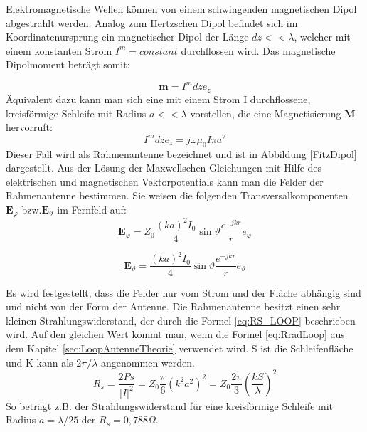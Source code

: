 Elektromagnetische Wellen können  von einem schwingenden magnetischen Dipol
abgestrahlt werden. Analog zum Hertzschen Dipol befindet sich im Koordinatenursprung
ein magnetischer Dipol der Länge $dz<<\lambda$, welcher mit einem konstanten
Strom $I^{m}=constant$ durchflossen wird. Das magnetische Dipolmoment beträgt somit:

\begin{equation}
\textbf{m}=I^{m}dze_z
\end{equation}
Äquivalent dazu kann man sich eine mit einem Strom I durchflossene, kreisförmige Schleife mit Radius $a<<\lambda$ vorstellen, die eine Magnetisierung $\textbf{M}$ hervorruft:
\begin{equation}
I^{m}dze_{z}=j\omega\mu_{0}I\pi a^{2}
\end{equation}
Dieser Fall wird als Rahmenantenne bezeichnet und ist in Abbildung \ref{FitzDipol} dargestellt. Aus der Lösung der Maxwellschen Gleichungen mit Hilfe des elektrischen und
magnetischen Vektorpotentials kann man die Felder der Rahmenantenne bestimmen.
Sie weisen die folgenden Transversalkomponenten $\textbf{E}_{\varphi}$ bzw.$\textbf{E}_{\vartheta}$ im Fernfeld auf:
\begin{equation}
\textbf{E}_{\varphi}=Z_{0}\dfrac{(ka)^2I_{0}}{4}\sin \vartheta \dfrac{e^{-jkr}}{r} e_{\varphi}
\end{equation}

\begin{equation}
\textbf{E}_{\vartheta}=\dfrac{(ka)^2I_{0}}{4}\sin \vartheta \dfrac{e^{-jkr}}{r} e_{\vartheta}
\end{equation}


Es wird festgestellt, dass die Felder nur vom Strom und der Fläche abhängig sind
und nicht von der Form der Antenne. 
Die Rahmenantenne besitzt einen sehr kleinen Strahlungswiderstand, der durch die
Formel \ref{eq:RS_LOOP} beschrieben wird. Auf den gleichen Wert kommt man, wenn die Formel \ref{eq:RradLoop} aus dem Kapitel \ref{sec:LoopAntenneTheorie} verwendet wird. S ist die Schleifenfläche und K kann als $2\pi/\lambda$ angenommen werden.
\begin{equation}\label{eq:RS_LOOP}
R_{s}=\dfrac{2Ps}{|I|^{2}}=Z_{0}\dfrac{\pi}{6}(k^{2}a^{2})^{2}=Z_{0}\dfrac{2\pi}{3}\left(\dfrac{kS}{\lambda}\right)^{2} 
\end{equation}
So beträgt z.B. der Strahlungswiderstand für eine kreisförmige Schleife mit Radius $a = \lambda/25$ der  $R_{s} = 0,788\Omega$.


